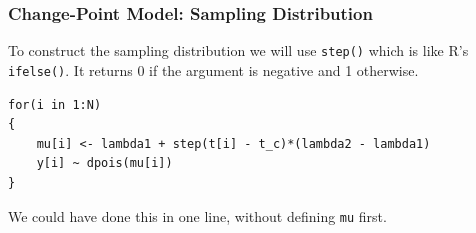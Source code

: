 \documentclass{beamer}
\begin{document}
\begin{frame}[fragile]
\frametitle{Change-Point Model: Sampling Distribution}
To construct the sampling distribution we will use \texttt{step()}
which is like R's \texttt{ifelse()}. It returns 0 if the argument is
negative and 1 otherwise.

\begin{verbatim}
for(i in 1:N)
{
    mu[i] <- lambda1 + step(t[i] - t_c)*(lambda2 - lambda1)
    y[i] ~ dpois(mu[i])
}
\end{verbatim}
\pause

We could have done this in one line, without defining \texttt{mu}
first.

\end{frame}
\end{document}
